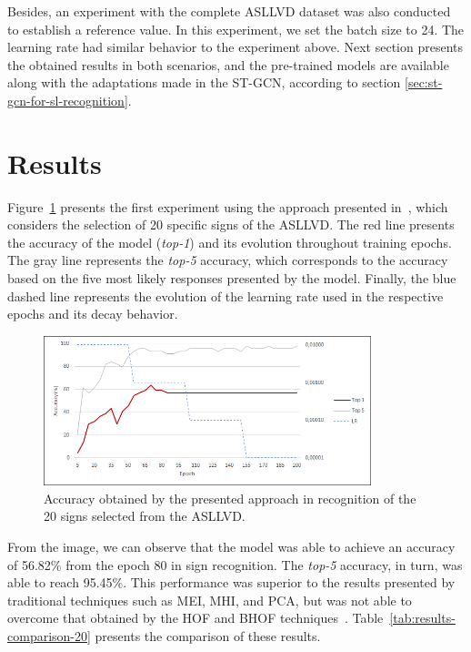 Besides, an experiment with the complete ASLLVD dataset was also conducted to establish a reference value. In this experiment, we set the batch size to 24. The learning rate had similar behavior to the experiment above. Next section presents the obtained results in both scenarios, and the pre-trained models are available along with the adaptations made in the ST-GCN, according to section \ref{sec:st-gcn-for-sl-recognition}.


\section{Results} 
\label{sec:results}

Figure~\ref{fig:training-asllvd-20} presents the first experiment using the approach presented in~\cite{lim-2016}, which considers the selection of 20 specific signs of the ASLLVD. The red line presents the accuracy of the model (\textit{top-1}) and its evolution throughout training epochs. The gray line represents the \textit{top-5} accuracy, which corresponds to the accuracy based on the five most likely responses presented by the model. Finally, the blue dashed line represents the evolution of the learning rate used in the respective epochs and its decay behavior.

\begin{figure}[!t]
    \centering
    \includegraphics[width=0.85\textwidth]{images/results_20}
    \caption{Accuracy obtained by the presented approach in recognition of the 20 signs selected from the ASLLVD.}
    \label{fig:training-asllvd-20}
\end{figure}

From the image, we can observe that the model was able to achieve an accuracy of 56.82\% from the epoch 80 in sign recognition. The \textit{top-5} accuracy, in turn, was able to reach 95.45\%. This performance was superior to the results presented by traditional techniques such as MEI, MHI, and PCA, but was not able to overcome that obtained by the HOF and BHOF techniques~\cite{lim-2016}. Table~\ref{tab:results-comparison-20} presents the comparison of these results.

